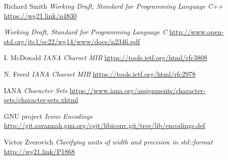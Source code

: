 \documentclass{wg21}
\begin{document}
\begin{thebibliography}{9}

    Richard Smith
    \emph{Working Draft, Standard for Programming Language C++}\newline
    \url{https://wg21.link/n4830}


    \emph{Working Draft, Standard for Programming Language C}\newline
    \url{ http://www.open-std.org/jtc1/sc22/wg14/www/docs/n2346.pdf}




    I. McDonald
    \emph{IANA Charset MIB}\newline
    \url{https://tools.ietf.org/html/rfc3808}

    N. Freed
    \emph{IANA Charset MIB}\newline
    \url{https://tools.ietf.org/html/rfc2978}

    IANA
    \emph{Character Sets}\newline
    \url{https://www.iana.org/assignments/character-sets/character-sets.xhtml}


    GNU project
    \emph{Iconv Encodings}\newline
    \url{http://git.savannah.gnu.org/cgit/libiconv.git/tree/lib/encodings.def}

    Victor Zverovich
    \emph{Clarifying units of width and precision in std::format}\newline
    \url{http://wg21.link/P1868}



\end{thebibliography}
\end{document}
